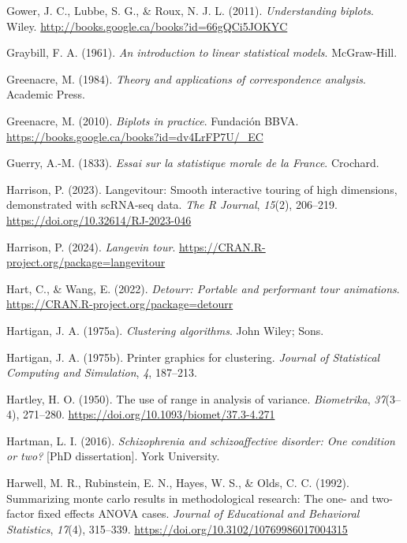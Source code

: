 \documentclass[
  letterpaper,
  10pt,
  krantz2]{krantz}
\newlength{\cslhangindent}
\newenvironment{CSLReferences}[2] %
 {\begin{list}{}{%
  \setlength{\itemindent}{0pt}
  \setlength{\leftmargin}{0pt}
  \setlength{\parsep}{0pt}
  \ifodd #1
   \setlength{\leftmargin}{\cslhangindent}
   \setlength{\itemindent}{-1\cslhangindent}
  \fi
  \setlength{\itemsep}{#2\baselineskip}}}
 {\end{list}}
\begin{document}
\begin{CSLReferences}{1}{0}
Gower, J. C., Lubbe, S. G., \& Roux, N. J. L. (2011).
\emph{Understanding biplots}. Wiley.
\url{http://books.google.ca/books?id=66gQCi5JOKYC}

Graybill, F. A. (1961). \emph{An introduction to linear statistical
models}. McGraw-Hill.

Greenacre, M. (1984). \emph{Theory and applications of correspondence
analysis}. Academic Press.

Greenacre, M. (2010). \emph{Biplots in practice}. Fundaci{ó}n BBVA.
\url{https://books.google.ca/books?id=dv4LrFP7U/_EC}

Guerry, A.-M. (1833). \emph{Essai sur la statistique morale de la
{France}}. Crochard.

Harrison, P. (2023). Langevitour: Smooth interactive touring of high
dimensions, demonstrated with scRNA-seq data. \emph{The R Journal},
\emph{15}(2), 206--219. \url{https://doi.org/10.32614/RJ-2023-046}

Harrison, P. (2024). \emph{Langevin tour}.
\url{https://CRAN.R-project.org/package=langevitour}

Hart, C., \& Wang, E. (2022). \emph{Detourr: Portable and performant
tour animations}. \url{https://CRAN.R-project.org/package=detourr}

Hartigan, J. A. (1975a). \emph{Clustering algorithms}. John Wiley; Sons.

Hartigan, J. A. (1975b). Printer graphics for clustering. \emph{Journal
of Statistical Computing and Simulation}, \emph{4}, 187--213.

Hartley, H. O. (1950). The use of range in analysis of variance.
\emph{Biometrika}, \emph{37}(3--4), 271--280.
\url{https://doi.org/10.1093/biomet/37.3-4.271}

Hartman, L. I. (2016). \emph{Schizophrenia and schizoaffective disorder:
One condition or two?} {[}PhD dissertation{]}. York University.

Harwell, M. R., Rubinstein, E. N., Hayes, W. S., \& Olds, C. C. (1992).
Summarizing monte carlo results in methodological research: The one- and
two-factor fixed effects {ANOVA} cases. \emph{Journal of Educational and
Behavioral Statistics}, \emph{17}(4), 315--339.
\url{https://doi.org/10.3102/10769986017004315}


\end{CSLReferences}
\end{document}
